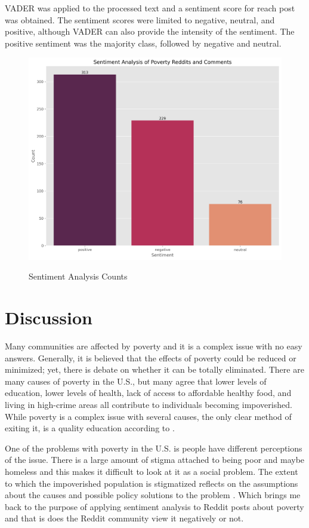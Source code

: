 \documentclass[stu,12pt,floatsintext]{apa7}
\begin{document}
\indent VADER was applied to the processed text and a sentiment score for reach post was obtained.  The sentiment scores were limited to negative, neutral, and positive, although VADER can also provide the intensity of the sentiment.  The positive sentiment was the majority class, followed by negative and neutral. 
\begin{figure}[H]
	\centering
	\caption{Sentiment Analysis Counts}
	\includegraphics[width=0.75\linewidth]{figures/sentimentAnalysisSimple.png}
	\label{fig:sentiment_analysis}
\end{figure}
\section{Discussion}
\indent Many communities are affected by poverty and it is a complex issue with no easy answers.  Generally, it is believed that the effects of poverty could be reduced or minimized; yet, there is debate on whether it can be totally eliminated.  There are many causes of poverty in the U.S., but many agree that lower levels of education, lower levels of health, lack of access to affordable healthy food, and living in high-crime areas all contribute to individuals becoming impoverished.  While poverty is a complex issue with several causes, the only clear method of exiting it, is a quality education according to \citep{tackie2021}.

\indent One of the problems with poverty in the U.S. is people have different perceptions of the issue.  There is a large amount of stigma attached to being poor and maybe homeless and this makes it difficult to look at it as a social problem.  The extent to which the impoverished population is stigmatized reflects on the assumptions about the causes and possible policy solutions to the problem \citep{bowen2024}.  Which brings me back to the purpose of applying sentiment analysis to Reddit posts about poverty and that is does the Reddit community view it negatively or not.
\end{document}
